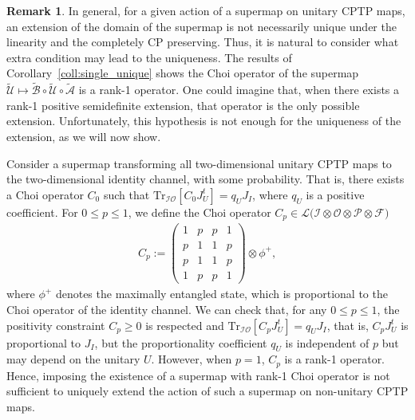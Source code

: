 \documentclass[a4paper,twocolumn,accepted=2022-10-23]{quantumarticle}
\newcommand{\Tr}[0]{{\mathrm{Tr}}}
\newcommand{\fcal}[0]{{\mathcal{F}}}
\newcommand{\ical}[0]{{\mathcal{I}}}
\newcommand{\ocal}[0]{{\mathcal{O}}}
\newcommand{\pcal}[0]{{\mathcal{P}}}
\newcommand{\tmap}[1]{\widetilde{\mbox{$\mathcal{#1}$}}}
\theoremstyle{definition}
\newtheorem{rem}{Remark}
\begin{document}
\begin{rem}
In general, for a given action of a supermap on unitary CPTP maps,
an extension of the domain of the supermap is not necessarily unique under the linearity and the completely CP preserving.
Thus, it is natural to consider what extra condition may lead to the uniqueness.
The results of Corollary~\ref{coll:single_unique} shows  the Choi operator of the supermap $\tmap{U} \mapsto \tmap{B} \circ \tmap{U} \circ \tmap{A}$ is a rank-1 operator.
One could imagine that, when there exists a rank-1 positive semidefinite extension, that operator is the only possible extension.
Unfortunately, this hypothesis is not enough for the uniqueness of the extension, as we will now show.

Consider a supermap transforming all two-dimensional unitary CPTP maps
to the two-dimensional identity channel, with some probability.
That is, there exists a Choi operator $C_0$ such that $\Tr_{\ical \ocal} [ C_0 J_{U}^t ] =q_U J_I$, where $q_U$ is a positive coefficient.
For $0 \leq p \leq 1$, we define the Choi operator  $C_p \in \mathcal{L} \big(\ical \otimes \ocal \otimes \pcal \otimes \fcal\big)$
\begin{align}
C_p:=
\begin{pmatrix}
1 & p &  p & 1 \\
p & 1 & 1 & p \\
p & 1 & 1 & p \\
1 & p &  p & 1
\end{pmatrix}
\otimes \phi^+,
\end{align}
where $\phi^+$ denotes the maximally entangled state, which is proportional to the Choi operator of the identity channel.
We can check that, for any $0 \leq p \leq 1$, the positivity constraint $C_p\geq0$ is respected and $\Tr_{\ical \ocal} [C_p J_{U}^t] = q_U J_I$, that is, $C_p J_{U}^t $ is proportional to $J_I$, but the proportionality coefficient $q_U$ is independent of $p$ but may depend on the unitary $U$. However, when $p=1$, $C_p$ is a rank-1 operator. Hence, imposing the existence of a supermap with rank-1 Choi operator is not sufficient to uniquely extend the action of such a supermap on non-unitary CPTP maps.
\end{rem}
\end{document}
